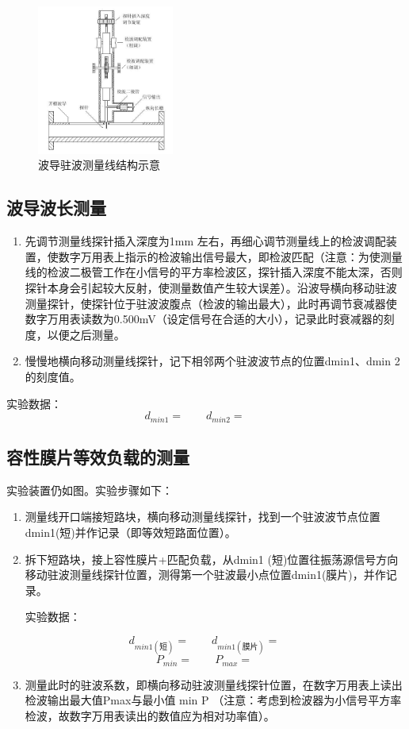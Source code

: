 \documentclass{../source/Experiment}
\begin{document}
            \begin{figure}[H]
                \centering
                \includegraphics[width = 0.4\textwidth]{pic/波导驻波测量线结构示意}
                \caption{波导驻波测量线结构示意}
            \end{figure}

        \subsection{波导波长测量}
            \begin{enumerate}
                \item 先调节测量线探针插入深度为1mm 左右，再细心调节测量线上的检波调配装置，使数字万用表上指示的检波输出信号最大，即检波匹配（注意：为使测量线的检波二极管工作在小信号的平方率检波区，探针插入深度不能太深，否则探针本身会引起较大反射，使测量数值产生较大误差）。沿波导横向移动驻波测量探针，使探针位于驻波波腹点（检波的输出最大），此时再调节衰减器使数字万用表读数为0.500mV（设定信号在合适的大小），记录此时衰减器的刻度，以便之后测量。
                \item 慢慢地横向移动测量线探针，记下相邻两个驻波波节点的位置dmin1、dmin 2的刻度值。
            \end{enumerate}
            实验数据：$$d_{min1} = \qquad d_{min2} = \qquad$$

        \subsection{容性膜片等效负载的测量}
        实验装置仍如图。实验步骤如下：
            \begin{enumerate}
                \item 测量线开口端接短路块，横向移动测量线探针，找到一个驻波波节点位置dmin1(短)并作记录（即等效短路面位置）。
                \item 拆下短路块，接上容性膜片+匹配负载，从dmin1 (短)位置往振荡源信号方向移动驻波测量线探针位置，测得第一个驻波最小点位置dmin1(膜片)，并作记录。
                
                实验数据：

                $$d_{min1(\mbox{短})} = \qquad d_{min1(\mbox{膜片})} = \qquad$$
                $$P_{min} = \qquad P_{max} = \qquad$$

                \item 测量此时的驻波系数，即横向移动驻波测量线探针位置，在数字万用表上读出检波输出最大值Pmax与最小值 min P （注意：考虑到检波器为小信号平方率检波，故数字万用表读出的数值应为相对功率值）。
            \end{enumerate}
\end{document}
